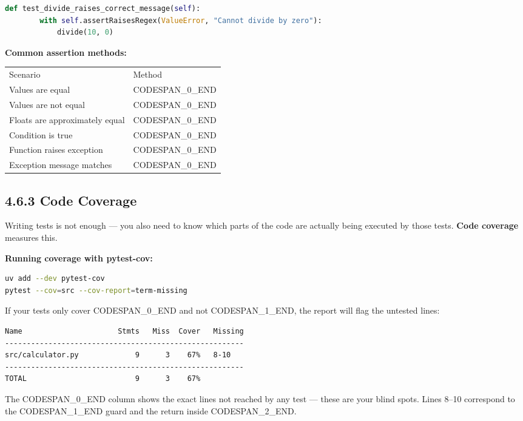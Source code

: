 \documentclass[11pt,a4paper]{book}
\begin{document}
\begin{lstlisting}[language=Python]
    def test_divide_raises_correct_message(self):
        with self.assertRaisesRegex(ValueError, "Cannot divide by zero"):
            divide(10, 0)
\end{lstlisting}

\textbf{Common assertion methods:}

\begin{tabular}{ll}
\hline
Scenario & Method \\
Values are equal & CODESPAN\_0\_END \\
Values are not equal & CODESPAN\_0\_END \\
Floats are approximately equal & CODESPAN\_0\_END \\
Condition is true & CODESPAN\_0\_END \\
Function raises exception & CODESPAN\_0\_END \\
Exception message matches & CODESPAN\_0\_END \\
\hline
\end{tabular}

\subsection{4.6.3 Code Coverage}

Writing tests is not enough --- you also need to know which parts of the code are actually being executed by those tests. \textbf{Code coverage} measures this.

\textbf{Running coverage with pytest-cov:}

\begin{lstlisting}[language=Bash]
uv add --dev pytest-cov
pytest --cov=src --cov-report=term-missing
\end{lstlisting}

If your tests only cover CODESPAN\_0\_END and not CODESPAN\_1\_END, the report will flag the untested lines:

\begin{lstlisting}
Name                      Stmts   Miss  Cover   Missing
-------------------------------------------------------
src/calculator.py             9      3    67%   8-10
-------------------------------------------------------
TOTAL                         9      3    67%
\end{lstlisting}

The CODESPAN\_0\_END column shows the exact lines not reached by any test --- these are your blind spots. Lines 8--10 correspond to the CODESPAN\_1\_END guard and the return inside CODESPAN\_2\_END.
\end{document}
